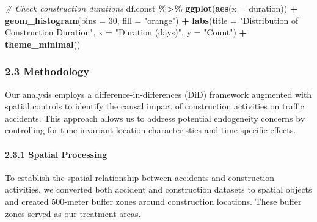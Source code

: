 \documentclass[
]{article}
\newenvironment{Shaded}{\begin{snugshade}}{\end{snugshade}}
\newcommand{\AttributeTok}[1]{\textcolor[rgb]{0.13,0.29,0.53}{#1}}
\newcommand{\CommentTok}[1]{\textcolor[rgb]{0.56,0.35,0.01}{\textit{#1}}}
\newcommand{\DecValTok}[1]{\textcolor[rgb]{0.00,0.00,0.81}{#1}}
\newcommand{\FunctionTok}[1]{\textcolor[rgb]{0.13,0.29,0.53}{\textbf{#1}}}
\newcommand{\NormalTok}[1]{#1}
\newcommand{\SpecialCharTok}[1]{\textcolor[rgb]{0.81,0.36,0.00}{\textbf{#1}}}
\newcommand{\StringTok}[1]{\textcolor[rgb]{0.31,0.60,0.02}{#1}}
\begin{document}
\begin{Shaded}
\begin{Highlighting}[]
\CommentTok{\# Check construction durations}
\NormalTok{df.const }\SpecialCharTok{\%\textgreater{}\%}
  \FunctionTok{ggplot}\NormalTok{(}\FunctionTok{aes}\NormalTok{(}\AttributeTok{x =}\NormalTok{ duration)) }\SpecialCharTok{+}
  \FunctionTok{geom\_histogram}\NormalTok{(}\AttributeTok{bins =} \DecValTok{30}\NormalTok{, }\AttributeTok{fill =} \StringTok{"orange"}\NormalTok{) }\SpecialCharTok{+}
  \FunctionTok{labs}\NormalTok{(}\AttributeTok{title =} \StringTok{"Distribution of Construction Duration"}\NormalTok{,}
       \AttributeTok{x =} \StringTok{"Duration (days)"}\NormalTok{, }\AttributeTok{y =} \StringTok{"Count"}\NormalTok{) }\SpecialCharTok{+}
  \FunctionTok{theme\_minimal}\NormalTok{()}
\end{Highlighting}
\end{Shaded}

\subsubsection{2.3 Methodology}\label{methodology}

Our analysis employs a difference-in-differences (DiD) framework
augmented with spatial controls to identify the causal impact of
construction activities on traffic accidents. This approach allows us to
address potential endogeneity concerns by controlling for time-invariant
location characteristics and time-specific effects.

\paragraph{2.3.1 Spatial Processing}\label{spatial-processing}

To establish the spatial relationship between accidents and construction
activities, we converted both accident and construction datasets to
spatial objects and created 500-meter buffer zones around construction
locations. These buffer zones served as our treatment areas.
\end{document}

